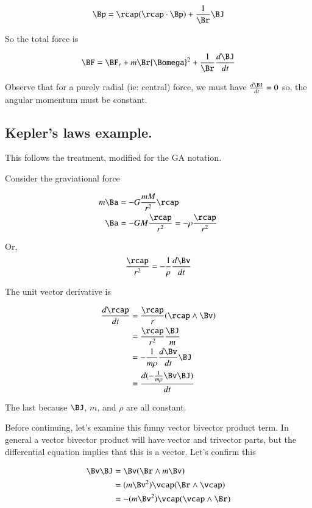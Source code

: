 \documentclass{article}
\newcommand{\dt}[1]{\frac{d {#1}}{dt}}
\begin{document}
\[
\Bp = \rcap (\rcap \cdot \Bp) + \frac{1}{\Br} \BJ 
\]

So the total force is

\begin{align*}
\BF 
    &= \BF_r + m \Br {\Bomega}^2 + \frac{1}{\Br}\dt{\BJ} \\
\end{align*}

Observe that for a purely radial (ie: central) force, we must have
$\dt{\BJ} = 0$
so, the angular
momentum must be constant.

\subsection{Kepler's laws example.}

This follows the \cite{salas1990coa} treatment, modified for the GA notation.

Consider the graviational force 

\begin{align*}
m \Ba &= -G \frac{m M}{r^2} \rcap \\
\Ba &= - G M \frac{\rcap}{r^2} = -\rho \frac{\rcap}{r^2}
\end{align*}

Or,
\[
\frac{\rcap}{r^2} = -\frac{1}{\rho} \dt{\Bv}
\]

The unit vector derivative is

\begin{align*}
\dt{\rcap} &= \frac{\rcap}{r}(\rcap \wedge \Bv) \\
           &= \frac{\rcap}{r^2}\frac{\BJ}{m} \\
           &= -\frac{1}{m \rho} \dt{\Bv} \BJ \\
           &= \dt{(-\frac{1}{m \rho} \Bv \BJ )} \\
\end{align*}

The last because $\BJ$, $m$, and $\rho$ are all constant.

Before continuing, let's examine this funny vector bivector product term.
In general a vector
bivector product will have vector and trivector parts, but
the differential equation implies that this is a vector.  Let's confirm this

\begin{align*}
\Bv \BJ &= \Bv (\Br \wedge m \Bv) \\
        &= (m \Bv^2) \vcap (\Br \wedge \vcap) \\
        &= - (m \Bv^2) \vcap (\vcap \wedge \Br) \\
\end{align*}
\end{document}

